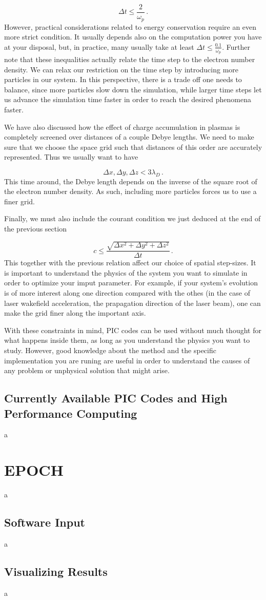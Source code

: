 \documentclass[12pt, class=report, crop=false]{standalone}
\begin{document}
\begin{equation}
  \Delta t \leq \frac{2}{\omega_p}\,.
\end{equation}
However, practical considerations related to energy conservation require an even more strict condition. It usually depends also on the computation power you have at your disposal, but, in practice, many usually take at least \(\Delta t \leq \frac{0.1}{\omega_p}\). Further note that these inequalities actually relate the time step to the electron number density. We can relax our restriction on the time step by introducing more particles in our system. In this perspective, there is a trade off one needs to balance, since more particles slow down the simulation, while larger time steps let us advance the simulation time faster in order to reach the desired phenomena faster.

We have also discussed how the effect of charge accumulation in plasmas is completely screened over distances of a couple Debye lengths. We need to make sure that we choose the space grid such that distances of this order are accurately represented. Thus we usually want to have

\begin{equation}
  \Delta x, \Delta y, \Delta z < 3 \lambda_D\,.
\end{equation}
This time around, the Debye length depends on the inverse of the square root of the electron number density. As such, including more particles forces us to use a finer grid.

Finally, we must also include the courant condition we just deduced at the end of the previous section

\begin{equation}
  c \leq \frac{\sqrt{\Delta x^2 + \Delta y^2 + \Delta z^2}}{\Delta t}\,.
\end{equation}
This together with the previous relation affect our choice of spatial step-sizes. It is important to understand the physics of the system you want to simulate in order to optimize your imput parameter. For example, if your system's evolution is of more interest along one direction compared with the othes (in the case of laser wakefield acceleration, the prapagation direction of the laser beam), one can make the grid finer along the important axis.

With these constraints in mind, PIC codes can be used without much thought for what happens inside them, as long as you understand the physics you want to study. However, good knowledge about the method and the specific implementation you are runing are useful in order to understand the causes of any problem or unphysical solution that might arise.

\subsection{Currently Available PIC Codes and High Performance Computing}
a

\section{EPOCH}
a
\subsection{Software Input}
a
\subsection{Visualizing Results}
a
\end{document}
